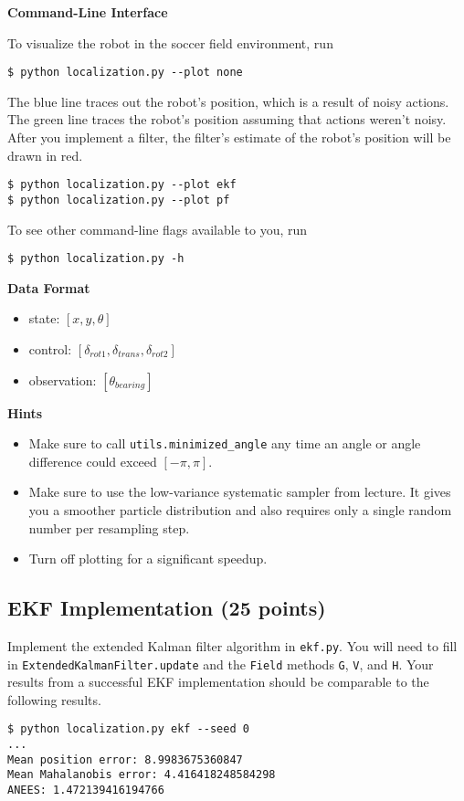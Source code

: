 \documentclass{article}
\newcommand{\?}{\stackrel{?}{=}}
\begin{document}
\textbf{Command-Line Interface}

To visualize the robot in the soccer field environment, run
\begin{verbatim}
$ python localization.py --plot none
\end{verbatim}
The blue line traces out the robot's position, which is a result of noisy actions.
The green line traces the robot's position assuming that actions weren't noisy.
After you implement a filter, the filter's estimate of the robot's position will be drawn in red.
\begin{verbatim}
$ python localization.py --plot ekf
$ python localization.py --plot pf
\end{verbatim}
To see other command-line flags available to you, run
\begin{verbatim}
$ python localization.py -h
\end{verbatim}

\textbf{Data Format}

\begin{itemize}
\item state: $[x, y, \theta]$
\item control: $[\delta_{rot1}, \delta_{trans}, \delta_{rot2}]$
\item observation: $[\theta_{bearing}]$
\end{itemize}

\textbf{Hints}

\begin{itemize}
\item
Make sure to call \verb|utils.minimized_angle| any time an angle or angle difference could exceed $[-\pi, \pi]$.
\item
Make sure to use the low-variance systematic sampler from lecture.
It gives you a smoother particle distribution and also requires only a single random number per resampling step.
\item
Turn off plotting for a significant speedup.
\end{itemize}

\clearpage

\subsection{EKF Implementation (25 points)}

Implement the extended Kalman filter algorithm in \texttt{ekf.py}.
You will need to fill in \verb|ExtendedKalmanFilter.update| and the \verb|Field| methods \verb|G|, \verb|V|, and \verb|H|.
Your results from a successful EKF implementation should be comparable to the following results.
\begin{verbatim}
$ python localization.py ekf --seed 0
...
Mean position error: 8.9983675360847
Mean Mahalanobis error: 4.416418248584298
ANEES: 1.472139416194766
\end{verbatim}
\end{document}
